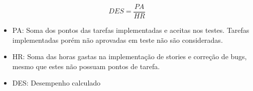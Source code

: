 \begin{equation}
    DES = \frac{PA}{HR}
\end{equation}

\begin{itemize}
    \item PA: Soma dos pontos das tarefas implementadas e aceitas nos testes. Tarefas implementadas porém não aprovadas em teste não são consideradas.
    \item HR: Soma das horas gastas na implementação de stories e correção de bugs, mesmo que estes não possuam pontos de tarefa.
    \item DES: Desempenho calculado
\end{itemize}
\bigskip
